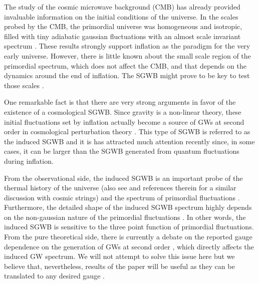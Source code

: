 \documentclass[aps,10pt,prd,groupedaddress,nofootinbib,notitlepage,eqsecnum,preprintnumbers]{revtex4-1}
\begin{document}
The study of the cosmic microwave background (CMB) has already provided invaluable information on the initial conditions of the universe. In the scales probed by the CMB, the primordial universe was homogeneous and isotropic, filled with tiny adiabatic gaussian fluctuations with an almost scale invariant spectrum \cite{Akrami:2018odb,Aghanim:2018eyx}. These results strongly support inflation \cite{Brout:1977ix,Starobinsky:1979ty,Guth:1980zm,Sato:1980yn} as the paradigm for the very early universe. However, there is little known about the small scale region of the primordial spectrum, which does not affect the CMB, and that depends on the dynamics around the end of inflation. The SGWB might prove to be key to test those scales \cite{Assadullahi:2009jc,Bugaev:2010bb,Inomata:2018epa,Sato-Polito:2019hws}.

One remarkable fact is that there are very strong arguments in favor of the existence of a cosmological SGWB. Since gravity is a non-linear theory, these initial fluctuations set by inflation actually become a source of GWs at second order in cosmological perturbation theory \cite{Kodama:1985bj,Mukhanov:1990me,Noh:2004bc,Hwang:2007ni,Ananda:2006af,Baumann:2007zm}. This type of SGWB is referred to as the induced SGWB and it is has attracted much attention recently \cite{Alabidi:2012ex,Alabidi:2013wtp,Hwang:2017oxa,Kohri:2018awv,Cai:2018dig,Bartolo:2018rku,Inomata:2018epa,Yuan:2019udt,Inomata:2019zqy,Inomata:2019ivs,Chen:2019xse,Yuan:2019wwo,DeLuca:2019ufz,Tomikawa:2019tvi,Gong:2019mui,Inomata:2019yww,Yuan:2019fwv} since, in some cases, it can be larger than the SGWB generated from quantum fluctuations during inflation. 

From the observational side, the induced SGWB is an important probe of the thermal history of the universe \cite{Watanabe:2006qe} (also see \cite{Cui:2017ufi,Bettoni:2018pbl,Cui:2018rwi} and references therein for a similar discussion with cosmic strings) and the spectrum of primordial fluctuations \cite{Assadullahi:2009jc,Bugaev:2010bb,Inomata:2018epa}. Furthermore, the detailed shape of the induced SGWB spectrum highly depends on the non-gaussian nature of the primordial fluctuations \cite{Cai:2018dig}. In other words, the induced SGWB is sensitive to the three point function of primordial fluctuations. From the pure theoretical side, there is currently a debate on the reported gauge dependence on the generation of GWs at second order \cite{Hwang:2017oxa,Domenech:2017ems,DeLuca:2019ufz,Gong:2019mui,Inomata:2019yww,Yuan:2019fwv}, which directly affects the induced GW spectrum. We will not attempt to solve this issue here but we believe that, nevertheless, results of the paper will be useful as they can be translated to any desired gauge \cite{Hwang:2017oxa}.
\end{document}
